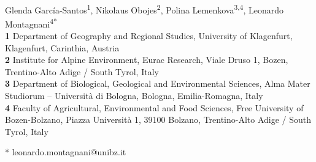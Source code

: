 \documentclass[10pt,letterpaper]{article}
\begin{document}
\vspace*{0.2in}

\begin{flushleft}
{\Large
\textbf{} 
}
\newline
\\
Glenda García-Santos\textsuperscript{1},
Nikolaus Obojes\textsuperscript{2},
Polina Lemenkova\textsuperscript{3,4},
Leonardo Montagnani\textsuperscript{4*}
\\
\bigskip
\textbf{1} Department of Geography and Regional Studies, University of Klagenfurt, Klagenfurt, Carinthia, Austria
\\
\textbf{2} Institute for Alpine Environment, Eurac Research, Viale Druso 1, Bozen, Trentino-Alto Adige / South Tyrol, Italy
\\
\textbf{3} Department of Biological, Geological and Environmental Sciences, Alma Mater Studiorum -- Università di Bologna, Bologna, Emilia-Romagna, Italy
\\
\textbf{4} Faculty of Agricultural, Environmental and Food Sciences, Free University of Bozen-Bolzano, Piazza Università 1, 39100 Bolzano, Trentino-Alto Adige / South Tyrol, Italy
\\
\bigskip

% 
%


* leonardo.montagnani@unibz.it

\end{flushleft}

\justifying
\end{document}
